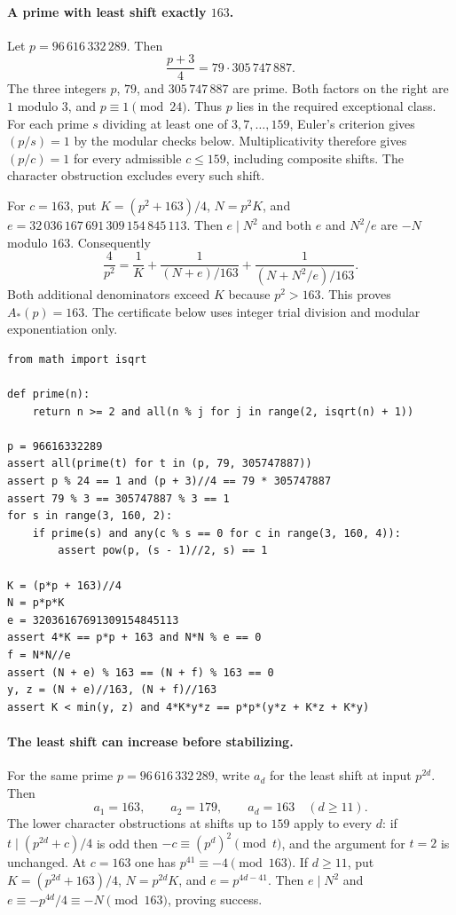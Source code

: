 \documentclass[a4paper,11pt]{article}
\theoremstyle{definition}\newtheorem{question}[theorem]{Question}
\begin{document}
\paragraph{A prime with least shift exactly $163$.}
Let $p=96\,616\,332\,289$. Then
\[
 \frac{p+3}{4}=79\cdot305\,747\,887.
\]
The three integers $p$, $79$, and $305\,747\,887$ are prime.
Both factors on the right are $1$ modulo $3$, and $p\equiv1\pmod{24}$.
Thus $p$ lies in the required exceptional class. For each prime $s$
dividing at least one of $3,7,\ldots,159$, Euler's criterion gives
$(p/s)=1$ by the modular checks below. Multiplicativity therefore gives
$(p/c)=1$ for every admissible $c\le159$, including composite shifts.
The character obstruction excludes every such shift.

For $c=163$, put $K=(p^2+163)/4$, $N=p^2K$, and
$e=32\,036\,167\,691\,309\,154\,845\,113$. Then $e\mid N^2$ and
both $e$ and $N^2/e$ are $-N$ modulo $163$. Consequently
\[
 \frac4{p^2}=\frac1K+
    \frac1{(N+e)/163}+\frac1{(N+N^2/e)/163}.
\]
Both additional denominators exceed $K$ because $p^2>163$.
This proves $A_*(p)=163$. The certificate below uses integer trial division
and modular exponentiation only.
\begin{Verbatim}[fontsize=\small]
from math import isqrt

def prime(n):
    return n >= 2 and all(n % j for j in range(2, isqrt(n) + 1))

p = 96616332289
assert all(prime(t) for t in (p, 79, 305747887))
assert p % 24 == 1 and (p + 3)//4 == 79 * 305747887
assert 79 % 3 == 305747887 % 3 == 1
for s in range(3, 160, 2):
    if prime(s) and any(c % s == 0 for c in range(3, 160, 4)):
        assert pow(p, (s - 1)//2, s) == 1

K = (p*p + 163)//4
N = p*p*K
e = 32036167691309154845113
assert 4*K == p*p + 163 and N*N % e == 0
f = N*N//e
assert (N + e) % 163 == (N + f) % 163 == 0
y, z = (N + e)//163, (N + f)//163
assert K < min(y, z) and 4*K*y*z == p*p*(y*z + K*z + K*y)
\end{Verbatim}


\paragraph{The least shift can increase before stabilizing.}
For the same prime $p=96\,616\,332\,289$, write $a_d$ for the least
shift at input $p^{2d}$. Then
\[
 a_1=163,\qquad a_2=179,\qquad a_d=163\quad(d\ge11).
\]
The lower character obstructions at shifts up to $159$ apply to
every $d$: if $t\mid(p^{2d}+c)/4$ is odd then $-c\equiv(p^d)^2\pmod t$,
and the argument for $t=2$ is unchanged. At $c=163$ one has
$p^{41}\equiv-4\pmod{163}$. If $d\ge11$, put $K=(p^{2d}+163)/4$,
$N=p^{2d}K$, and $e=p^{4d-41}$. Then $e\mid N^2$ and
$e\equiv-p^{4d}/4\equiv-N\pmod{163}$, proving success.
\end{document}

